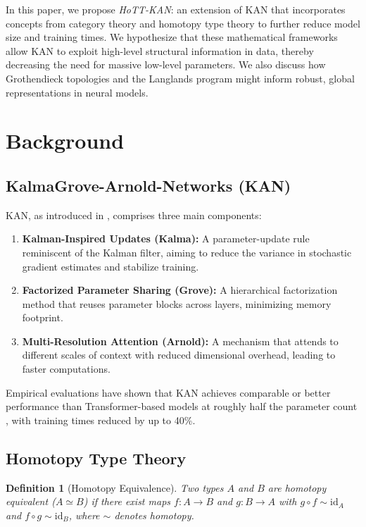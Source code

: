 \documentclass{article}
\newtheorem{definition}{Definition}[section]
\begin{document}
\vspace{1em}

In this paper, we propose \emph{HoTT-KAN}: an extension of KAN that incorporates concepts from category theory and homotopy type theory to further reduce model size and training times. We hypothesize that these mathematical frameworks allow KAN to exploit high-level structural information in data, thereby decreasing the need for massive low-level parameters. We also discuss how Grothendieck topologies and the Langlands program might inform robust, global representations in neural models.

\section{Background}
\label{sec:background}

\subsection{KalmaGrove-Arnold-Networks (KAN)}
KAN, as introduced in \citet{KAN2024}, comprises three main components:
\begin{enumerate}
    \item \textbf{Kalman-Inspired Updates (Kalma):} A parameter-update rule reminiscent of the Kalman filter, aiming to reduce the variance in stochastic gradient estimates and stabilize training.
    \item \textbf{Factorized Parameter Sharing (Grove):} A hierarchical factorization method that reuses parameter blocks across layers, minimizing memory footprint.
    \item \textbf{Multi-Resolution Attention (Arnold):} A mechanism that attends to different scales of context with reduced dimensional overhead, leading to faster computations.
\end{enumerate}

Empirical evaluations have shown that KAN achieves comparable or better performance than Transformer-based models at roughly half the parameter count \citep{KAN2024}, with training times reduced by up to 40\%.

\subsection{Homotopy Type Theory}
\begin{definition}[Homotopy Equivalence]
Two types $A$ and $B$ are \emph{homotopy equivalent} ($A \simeq B$) if there exist maps $f:A \to B$ and $g:B \to A$ with $g \circ f \sim \text{id}_A$ and $f \circ g \sim \text{id}_B$, where $\sim$ denotes homotopy.
\end{definition}
\end{document}
